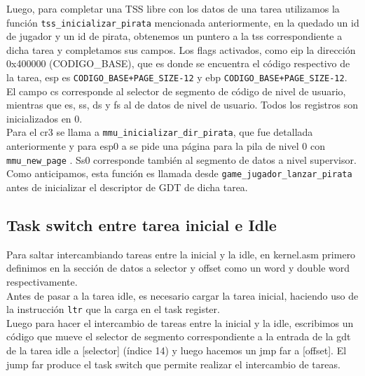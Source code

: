 Luego, para completar una TSS libre con los datos de una tarea utilizamos la función \texttt{tss\_inicializar\_pirata} mencionada anteriormente, en la quedado un id de jugador y un id de pirata, obtenemos un puntero a la tss correspondiente a dicha tarea y completamos sus campos. Los flags activados, como eip la dirección 0x400000 (CODIGO\_BASE), que es donde se encuentra el código respectivo de la tarea, esp es \texttt{CODIGO\_BASE+PAGE\_SIZE-12} y ebp \texttt{CODIGO\_BASE+PAGE\_SIZE-12}. El campo cs corresponde al selector de segmento de código de nivel de usuario, mientras que es, ss, ds y fs al de datos de nivel de usuario. Todos los registros son inicializados en 0.\\

Para el cr3 se llama a \texttt{mmu\_inicializar\_dir\_pirata}, que fue detallada anteriormente y para  esp0 a  se pide una página para la pila de nivel 0 con \texttt{mmu\_new\_page} . Ss0 corresponde también al segmento de datos a nivel supervisor. Como anticipamos, esta función es llamada desde \texttt{game\_jugador\_lanzar\_pirata} antes de inicializar el descriptor de GDT de dicha tarea.\\

\subsection{Task switch entre tarea inicial e Idle}

Para saltar intercambiando tareas entre la inicial y la idle, en kernel.asm primero definimos en la sección de datos a selector y offset como un word y double word respectivamente.\\

Antes de pasar a la tarea idle, es necesario cargar la tarea inicial, haciendo uso de la instrucción \texttt{ltr} que la carga en el task register.\\

Luego para hacer el intercambio de tareas entre la inicial y la idle, escribimos un código que mueve el selector de segmento correspondiente a la entrada de la gdt de la tarea idle a [selector] (índice 14) y luego hacemos un jmp far a [offset]. El jump far produce el task switch que permite realizar el intercambio de tareas.

